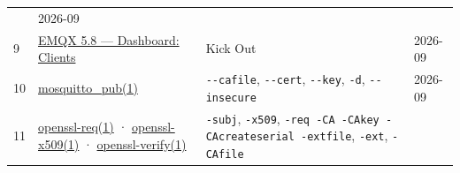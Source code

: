 \begin{longtable}[]{@{}llll@{}}
\begin{minipage}[t]{0.22\columnwidth}
\end{minipage} & \begin{minipage}[t]{0.22\columnwidth}\raggedright
2026-09\strut
\end{minipage}\tabularnewline
\begin{minipage}[t]{0.22\columnwidth}\raggedright
9\strut
\end{minipage} & \begin{minipage}[t]{0.22\columnwidth}\raggedright
\href{https://docs.emqx.com/en/emqx/v5.8/guides/dashboard/connections.html}{EMQX 5.\allowbreak{}8 --- Dashboard: Clients}\strut
\end{minipage} & \begin{minipage}[t]{0.22\columnwidth}\raggedright
Kick Out\strut
\end{minipage} & \begin{minipage}[t]{0.22\columnwidth}\raggedright
2026-09\strut
\end{minipage}\tabularnewline
\begin{minipage}[t]{0.22\columnwidth}\raggedright
10\strut
\end{minipage} & \begin{minipage}[t]{0.22\columnwidth}\raggedright
\href{https://mosquitto.org/man/mosquitto_pub-1.html}{mosquitto\_pub(1)}\strut
\end{minipage} & \begin{minipage}[t]{0.22\columnwidth}\raggedright
\texttt{-\/-cafile}, \texttt{-\/-cert}, \texttt{-\/-key}, \texttt{-d}, \texttt{-\/-insecure}\strut
\end{minipage} & \begin{minipage}[t]{0.22\columnwidth}\raggedright
2026-09\strut
\end{minipage}\tabularnewline
\begin{minipage}[t]{0.22\columnwidth}\raggedright
11\strut
\end{minipage} & \begin{minipage}[t]{0.22\columnwidth}\raggedright
\href{https://docs.openssl.org/3.0/man1/openssl-req/}{openssl-req(1)} · \href{https://docs.openssl.org/3.0/man1/openssl-x509/}{openssl-x509(1)} · \href{https://docs.openssl.org/3.0/man1/openssl-verify/}{openssl-verify(1)}\strut
\end{minipage} & \begin{minipage}[t]{0.22\columnwidth}\raggedright
\texttt{-subj}, \texttt{-x509}, \texttt{-req\ -CA\ -CAkey\ -CAcreateserial\ -extfile}, \texttt{-ext}, \texttt{-CAfile}\strut
\end{minipage} & \begin{minipage}[t]{0.22\columnwidth}\raggedright

\end{minipage}
\end{longtable}
